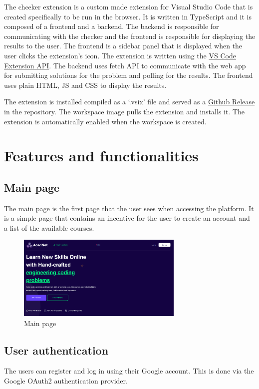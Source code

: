 \documentclass[12pt,a4paper]{report}
\begin{document}
The chceker extension is a custom made extension for Visual Studio Code that is created specifically to be run in the browser. It is written in TypeScript and it is composed of a frontend and a backend. The backend is responsible for communicating with the checker and the frontend is responsible for displaying the results to the user. The frontend is a sidebar panel that is displayed when the user clicks the extension's icon. The extension is written using the \href{https://code.visualstudio.com/api}{VS Code Extension API}. The backend uses fetch API to communicate with the web app for submitting solutions for the problem and polling for the results. The frontend uses plain HTML, JS and CSS to display the results.

The extension is installed compiled as a `.vsix' file and served as a \href{https://github.com/acadnet-dev/vscode-checker-extension/releases}{Github Release} in the repository. The workspace image pulls the extension and installs it. The extension is automatically enabled when the workspace is created.


\chapter{Features and functionalities}
\section{Main page}
The main page is the first page that the user sees when accessing the platform. It is a simple page that contains an incentive for the user to create an account and a list of the available courses. 

\begin{figure}[h]
	\centering
	\includegraphics[width=300px]{./pics/front-page.png}
	\caption{Main page}
	\label{fig:main-page}
\end{figure}

\section{User authentication}
The users can register and log in using their Google account. This is done via the Google OAuth2 authentication provider.
\end{document}
